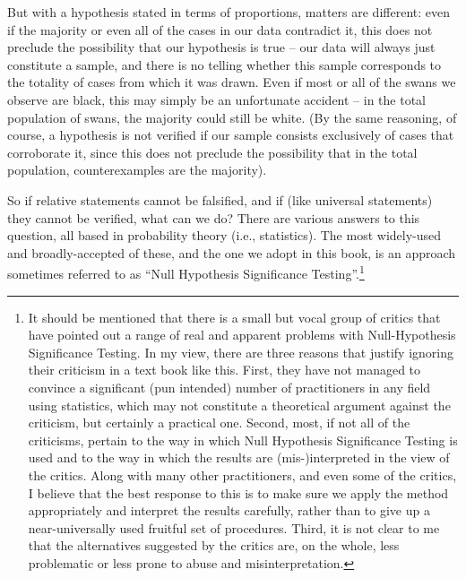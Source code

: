 But with a hypothesis  stated in terms of proportions, matters are different: even if the majority or even all of the cases in our data contradict it, this does not preclude the possibility that our hypothesis is true -- our data will always just constitute a sample,  and there is no telling whether this sample corresponds to the totality of cases from which it was drawn. Even if most or all of the swans we observe are black, this may simply be an unfortunate accident -- in the total population of swans, the majority could still be white. (By the same reasoning, of course, a hypothesis is not verified if our sample consists exclusively of cases that corroborate  it, since this does not preclude the possibility that in the total population, counterexamples  are the majority).

So if relative statements cannot be falsified,  and if (like universal statements) they cannot be verified, what can we do? There are various answers to this question, all based in probability  theory (i.e., statistics).  The most widely\hyp{}used and broadly\hyp{}accepted of these, and the one we adopt in this book, is an approach sometimes referred to as ``Null Hypothesis  Significance Testing''.\footnote{It should be mentioned that there is a small but vocal group of critics that have pointed out a range of real and apparent problems with Null\hyp{}Hypothesis Significance Testing. In my view, there are three reasons that justify ignoring their criticism in a text book like this. First, they have not managed to convince a significant (pun intended) number of practitioners in any field using statistics,  which may not constitute a theoretical argument against the criticism, but certainly a practical one. Second, most, if not all of the criticisms, pertain to the way in which Null Hypothesis  Significance Testing is used and to the way in which the results are (mis-)interpreted in the view of the critics. Along with many other practitioners, and even some of the critics, I believe that the best response to this is to make sure we apply the method appropriately and interpret the results carefully, rather than to give up a near\hyp{}universally used fruitful set of procedures. Third, it is not clear to me that the alternatives suggested by the critics are, on the whole, less problematic or less prone to abuse and misinterpretation.}


